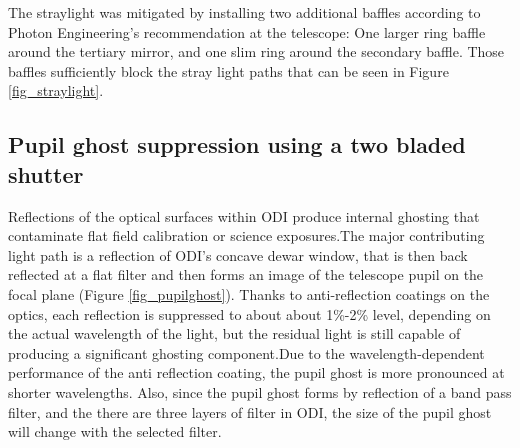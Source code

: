 \documentclass[]{spieman}
\begin{document}
The straylight was mitigated by installing two additional baffles according to
Photon Engineering's recommendation  at the telescope: One larger ring baffle
around the tertiary mirror, and one slim ring around the secondary baffle. Those
baffles sufficiently block the stray light paths that can be seen in Figure
\ref{fig_straylight}.


\subsection{Pupil ghost suppression using a two bladed shutter}
\label{sect_ghost}

Reflections of the optical surfaces within ODI produce internal ghosting that
contaminate flat field calibration or science exposures.The major contributing
light path is a reflection of ODI’s concave dewar window, that is then back
reflected at a flat filter and then forms an image of the telescope pupil on the
focal plane (Figure \ref{fig_pupilghost}).  Thanks to anti-reflection coatings
on the optics, each reflection is suppressed to about about 1\%-2\% level,
depending on the actual wavelength of the light, but the residual light is still
capable of producing a significant ghosting component.Due to the
wavelength-dependent performance of the anti reflection coating, the pupil ghost
is more pronounced at shorter wavelengths. Also, since the pupil ghost forms by
reflection of a band pass filter, and the there are three layers of filter in
ODI, the size of the pupil ghost will change with the selected filter.
\end{document}
